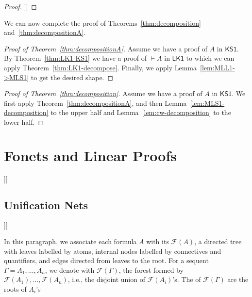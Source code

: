 \documentclass[conference,twosided,10pt]{IEEEtran}
\newcommand{\todo}[1]{{\color{red}     \noindent[\![\![{\bf TODO: }#1]\!]\!]}}
\theoremstyle{definition}
\newcommand*{\FOLK}{\mathsf{LK1}}
\newcommand*{\FOKS}{\mathsf{KS1}}
\newcommand{\sqn}[1]{\vdash#1}
\newcommand{\formtree}[1]{\mathcal{F}(#1)}
\begin{document}
\begin{proof}
  \todo{}
\end{proof}

We can now complete the proof of Theorems~\ref{thm:decomposition} and~\ref{thm:decompositionA}.

\begin{proof}[Proof of Theorem~\ref{thm:decompositionA}]
  Assume we have a proof of $A$ in $\FOKS$. By
  Theorem~\ref{thm:LK1-KS1} we have a proof of $\sqn A$ in $\FOLK$ to
  which we can apply Theorem~\ref{thm:LK1-decompose}. Finally, we
  apply Lemma~\ref{lem:MLL1->MLS1} to get the desired shape.
\end{proof}

\begin{proof}[Proof of Theorem~\ref{thm:decomposition}]
  Assume we have a proof of $A$ in $\FOKS$. We first apply
  Theorem~\ref{thm:decompositionA}, and then
  Lemma~\ref{lem:MLS1-decomposition} to the upper half and
  Lemma~\ref{lem:cw-decomposition} to the lower half.
\end{proof}


\section{Fonets and Linear Proofs}

\todo{}


\subsection{Unification Nets}

\todo{}

In this paragraph, we associate each formula $A$ with its 
$\formtree{A}$, a directed
tree with leaves labelled by atoms, internal nodes labelled by connectives and
quantifiers, and edges directed from leaves to the root. For a sequent
$\Gamma = A_1, \ldots, A_n$, we denote with $\formtree{\Gamma}$, the forest
formed by $\formtree{A_1}, \ldots, \formtree{A_n}$, i.e., the disjoint union of
$\formtree{A_i}$'s. The  of $\formtree{\Gamma}$ are the roots of
${A_i}$'s
\end{document}
